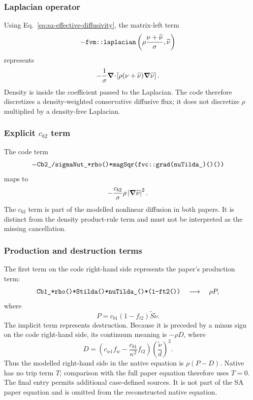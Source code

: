 \subsubsection{Laplacian operator}

Using Eq.~\eqref{eq:sa-effective-diffusivity}, the matrix-left term
\begin{equation*}
  -\texttt{fvm::laplacian}
  \left(
    \rho\frac{\nu+\widetilde{\nu}}{\sigma},
    \widetilde{\nu}
  \right)
\end{equation*}
represents
\begin{equation}
  -\frac{1}{\sigma}
  \boldsymbol{\nabla}\!\cdot\!\left[
    \rho(\nu+\widetilde{\nu})\boldsymbol{\nabla}\widetilde{\nu}
  \right].
  \label{eq:sa-native-laplacian}
\end{equation}
Density is inside the coefficient passed to the Laplacian.  The code therefore
discretizes a density-weighted conservative diffusive flux; it does not
discretize \(\rho\) multiplied by a density-free Laplacian.

\subsubsection{Explicit \texorpdfstring{\(c_{b2}\)}{cb2} term}

The code term
\[
  -\texttt{Cb2\_/sigmaNut\_*rho()*magSqr(fvc::grad(nuTilda\_)()())}
\]
maps to
\begin{equation}
  -\frac{c_{b2}}{\sigma}\rho
  \left|\boldsymbol{\nabla}\widetilde{\nu}\right|^2.
  \label{eq:sa-native-cb2}
\end{equation}
The \(c_{b2}\) term is part of the modelled nonlinear diffusion in both
papers.  It is distinct from the density product-rule term and must not be
interpreted as the missing cancellation.

\subsubsection{Production and destruction terms}

The first term on the code right-hand side represents the paper's production
term:
\[
  \texttt{Cb1\_*rho()*Stilda()*nuTilda\_()*(1-ft2())}
  \quad\longrightarrow\quad
  \rho P,
\]
where
\begin{equation}
  P=c_{b1}(1-f_{t2})\widetilde S\widetilde{\nu}.
  \label{eq:sa-native-production}
\end{equation}
The implicit  term represents destruction.  Because it is
preceded by a minus sign on the code right-hand side, its continuum meaning is
\(-\rho D\), where
\begin{equation}
  D=
  \left(
    c_{w1}f_w-\frac{c_{b1}}{\kappa^2}f_{t2}
  \right)
  \left(\frac{\widetilde{\nu}}{d}\right)^2.
  \label{eq:sa-native-destruction}
\end{equation}
Thus the modelled right-hand side in the native equation is \(\rho(P-D)\).
Native \SAOF{} has no trip term \(T\); comparison with the full paper equation
therefore uses \(T=0\).  The final
 entry permits additional case-defined
sources.  It is not part of the SA paper equation and is omitted from the
reconstructed native equation.

